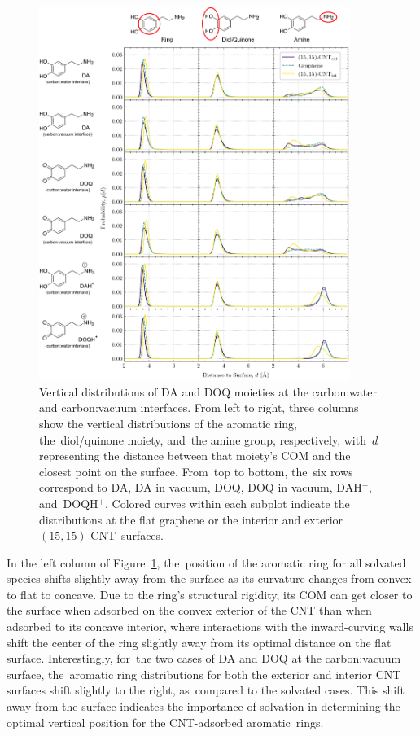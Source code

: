 \documentclass[molecules,article,accept,pdftex,moreauthors]{Definitions/mdpi}
\begin{document}
\begin{figure}[H]
    \includegraphics[width=0.9\textwidth]{Appendices/derivatives_vertical/output.png}
    \caption{Vertical distributions of DA and DOQ moieties at the carbon:water and carbon:vacuum interfaces. From left to right, three columns show the vertical distributions of the aromatic ring, the~diol/quinone moiety, and~the amine group, respectively, with~$d$ representing the distance between that moiety's COM and the closest point on the surface. From~top to bottom, the~six rows correspond to DA, DA in vacuum, DOQ, DOQ in vacuum, DAH$^+$, and~DOQH$^+$. Colored curves within each subplot indicate the distributions at the flat graphene or the interior and exterior $(15,15)$-CNT~surfaces.}
    \label{fig:Conf_vertical_derivatives}
\end{figure}
    
In the left column of Figure~\ref{fig:Conf_vertical_derivatives}, the~position of the aromatic ring for all solvated species shifts slightly away from the surface as its curvature changes from convex to flat to concave. Due to the ring's structural rigidity, its COM can get closer to the surface when adsorbed on the convex exterior of the CNT than when adsorbed to its concave interior, where interactions with the inward-curving walls shift the center of the ring slightly away from its optimal distance on the flat surface. Interestingly, for~the two cases of DA and DOQ at the carbon:vacuum surface, the~aromatic ring distributions for both the exterior and interior CNT surfaces shift slightly to the right, as~compared to the solvated cases. This shift away from the surface indicates the importance of solvation in determining the optimal vertical position for the CNT-adsorbed aromatic~rings.
  
\end{document}
